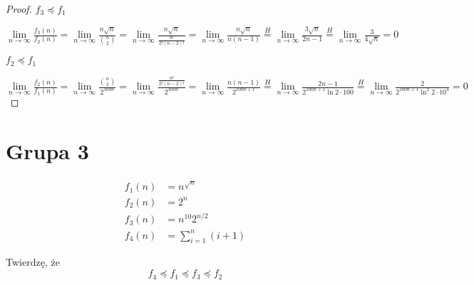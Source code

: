 \documentclass[50pt]{mwart}
\begin{document}
\begin{proof}
	$ f_3\preccurlyeq f_1 $
	
	\noindent$ \lim\limits_{n\to\infty} \frac{f_3(n)}{f_2(n)} = \lim\limits_{n\to\infty} \frac{n\sqrt n}{{n\choose2}} = \lim\limits_{n\to\infty} \frac{n\sqrt n}{\frac{n!}{2!(n-2)!}} = \lim\limits_{n\to\infty} \frac{n\sqrt n}{n(n-1)} \overset{H}{=} \lim\limits_{n\to\infty} \frac{3\sqrt n}{2n - 1} \overset{H}{=} \lim\limits_{n\to\infty} \frac{3}{4\sqrt n} = 0$\newline
	
	$ f_2 \preccurlyeq f_1 $
	
	\noindent$ \lim\limits_{n\to\infty} \frac{f_2(n)}{f_1(n)} = \lim\limits_{n\to\infty} \frac{{n\choose2}}{2^{100n}} = \lim\limits_{n\to\infty} \frac{\frac{n!}{2!(n-2)!}}{2^{100n}} = \lim\limits_{n\to\infty} \frac{n(n-1)}{2^{100n+1}} \overset{H}{=} \lim\limits_{n\to\infty} \frac{2n - 1}{2^{100n+1}\ln2\cdot100} \overset{H}{=} \lim\limits_{n\to\infty} \frac{2}{2^{100n+1}\ln^2 2\cdot10^4} = 0$\newline
\end{proof}

\section{Grupa 3}
\begin{align*}
f_1(n) &= n^{\sqrt n}\\
f_2(n) &= 2^n\\
 f_3(n) &= n^{10}2^{n/2} \\
 f_4(n) &= \sum\limits^n_{i=1}(i+1)
\end{align*}

Twierdzę, że
$$ f_4\preccurlyeq f_1\preccurlyeq f_3\preccurlyeq f_2$$
\end{document}
